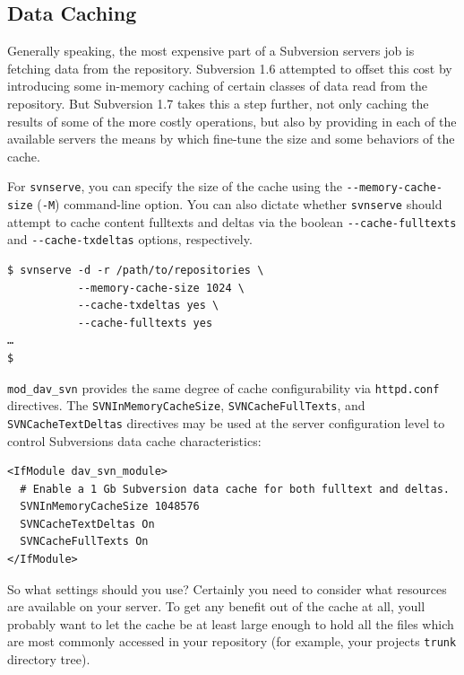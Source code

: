 \subsection{Data Caching}\label{svn.serverconfig.optimization.caching}

Generally speaking, the most expensive part of a Subversion
server\textquotesingle s job is fetching data from the repository.
Subversion 1.6 attempted to offset this cost by introducing some
in-memory caching of certain classes of data read from the repository.
But Subversion 1.7 takes this a step further, not only caching the
results of some of the more costly operations, but also by providing in
each of the available servers the means by which fine-tune the size and
some behaviors of the cache.

For \texttt{svnserve}, you can specify the size of the cache using the
\texttt{-\/-memory-cache-size} (\texttt{-M}) command-line option. You
can also dictate whether \texttt{svnserve} should attempt to cache
content fulltexts and deltas via the boolean
\texttt{-\/-cache-fulltexts} and \texttt{-\/-cache-txdeltas} options,
respectively.

\begin{verbatim}
$ svnserve -d -r /path/to/repositories \
           --memory-cache-size 1024 \
           --cache-txdeltas yes \
           --cache-fulltexts yes
…
$
\end{verbatim}

\texttt{mod\_dav\_svn} provides the same degree of cache configurability
via \texttt{httpd.conf} directives. The \texttt{SVNInMemoryCacheSize},
\texttt{SVNCacheFullTexts}, and \texttt{SVNCacheTextDeltas} directives
may be used at the server configuration level to control
Subversion\textquotesingle s data cache characteristics:

\begin{verbatim}
<IfModule dav_svn_module>
  # Enable a 1 Gb Subversion data cache for both fulltext and deltas.
  SVNInMemoryCacheSize 1048576
  SVNCacheTextDeltas On
  SVNCacheFullTexts On
</IfModule>
\end{verbatim}

So what settings should you use? Certainly you need to consider what
resources are available on your server. To get any benefit out of the
cache at all, you\textquotesingle ll probably want to let the cache be
at least large enough to hold all the files which are most commonly
accessed in your repository (for example, your project\textquotesingle s
\texttt{trunk} directory tree).

